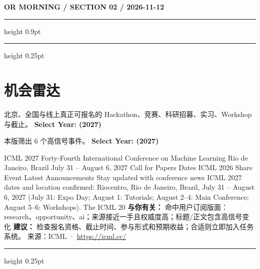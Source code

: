 \documentclass[10.5pt]{ctexart}
\begin{document}
\newpage
{\small\bfseries OR MORNING / SECTION 02 / 2026-11-12}
\vspace{2mm}
\hrule height 0.9pt
\vspace{1.5mm}
\hrule height 0.25pt
\vspace{4mm}
\section*{机会雷达}
{\color{ormuted} 北京、全国与线上真正可报名的 Hackathon、竞赛、科研招募、实习、Workshop 与截止。}
\vspace{2mm}
{\LARGE\bfseries Select Year: (2027)}\par
\vspace{1mm}
{\color{ormuted} 本版筛出 6 个高信号事件。}
\vspace{3mm}
{\Large\bfseries Select Year: (2027)}\par
ICML 2027 Forty-Fourth International Conference on Machine Learning Rio de Janeiro, Brazil July 31 – August 6, 2027 Call for Papers Dates ICML 2026 Share Event Latest Announcements Stay updated with conference news ICML 2027 dates and location confirmed: Riocentro, Rio de Janeiro, Brazil, July 31 – August 6, 2027 (July 31: Expo Day; August 1: Tutorials; August 2–4: Main Conference; August 5–6: Workshops). The ICML 20
\textbf{与你有关：} 命中用户订阅版面：research、opportunity、ai；来源接近一手且权威度高；标题/正文包含高信号变化
\textbf{建议：} 检查报名资格、截止时间、参与形式和预期收益；合适则立即加入任务系统。
{\footnotesize\color{ormuted} 来源：ICML · \url{https://icml.cc/}}
\vspace{4mm}
\hrule height 0.25pt
\vspace{3mm}
\end{document}
